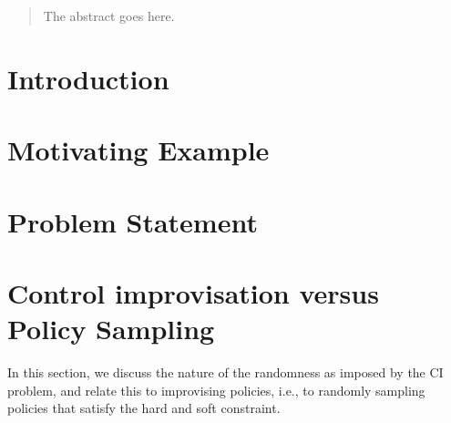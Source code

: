 \documentclass[conference]{IEEEtran}
\theoremstyle{remark}
\begin{document}
\begin{abstract}
The abstract goes here.
\end{abstract}

\IEEEpeerreviewmaketitle

\section{Introduction}

\section{Motivating Example}

\section{Problem Statement}

\section{Control improvisation versus Policy Sampling}
In this section, we discuss the nature of the randomness as imposed by the CI problem, and relate this to improvising policies, i.e., to randomly sampling policies that satisfy the hard and soft constraint.
\end{document}
